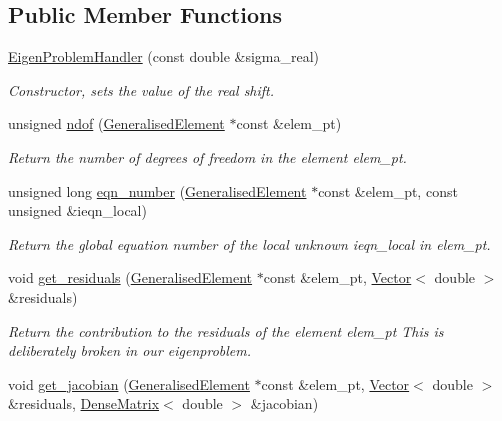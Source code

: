 \subsection*{Public Member Functions}
\begin{DoxyCompactItemize}
\item 
\hyperlink{classoomph_1_1EigenProblemHandler_ab5417bddb38214f66ac64b502ca665bc}{Eigen\+Problem\+Handler} (const double \&sigma\+\_\+real)
\begin{DoxyCompactList}\small\item\em Constructor, sets the value of the real shift. \end{DoxyCompactList}\item 
unsigned \hyperlink{classoomph_1_1EigenProblemHandler_ae9e44eeceee6e19c60c51b08195730eb}{ndof} (\hyperlink{classoomph_1_1GeneralisedElement}{Generalised\+Element} $\ast$const \&elem\+\_\+pt)
\begin{DoxyCompactList}\small\item\em Return the number of degrees of freedom in the element elem\+\_\+pt. \end{DoxyCompactList}\item 
unsigned long \hyperlink{classoomph_1_1EigenProblemHandler_ab94bef9c8135c9d2701e96d8205c797d}{eqn\+\_\+number} (\hyperlink{classoomph_1_1GeneralisedElement}{Generalised\+Element} $\ast$const \&elem\+\_\+pt, const unsigned \&ieqn\+\_\+local)
\begin{DoxyCompactList}\small\item\em Return the global equation number of the local unknown ieqn\+\_\+local in elem\+\_\+pt. \end{DoxyCompactList}\item 
void \hyperlink{classoomph_1_1EigenProblemHandler_a0dc97e08638986970c7ca5f3903c8b6d}{get\+\_\+residuals} (\hyperlink{classoomph_1_1GeneralisedElement}{Generalised\+Element} $\ast$const \&elem\+\_\+pt, \hyperlink{classoomph_1_1Vector}{Vector}$<$ double $>$ \&residuals)
\begin{DoxyCompactList}\small\item\em Return the contribution to the residuals of the element elem\+\_\+pt This is deliberately broken in our eigenproblem. \end{DoxyCompactList}\item 
void \hyperlink{classoomph_1_1EigenProblemHandler_aaaf7c3aa3713030ff4859117941b3a39}{get\+\_\+jacobian} (\hyperlink{classoomph_1_1GeneralisedElement}{Generalised\+Element} $\ast$const \&elem\+\_\+pt, \hyperlink{classoomph_1_1Vector}{Vector}$<$ double $>$ \&residuals, \hyperlink{classoomph_1_1DenseMatrix}{Dense\+Matrix}$<$ double $>$ \&jacobian)

\end{DoxyCompactItemize}
